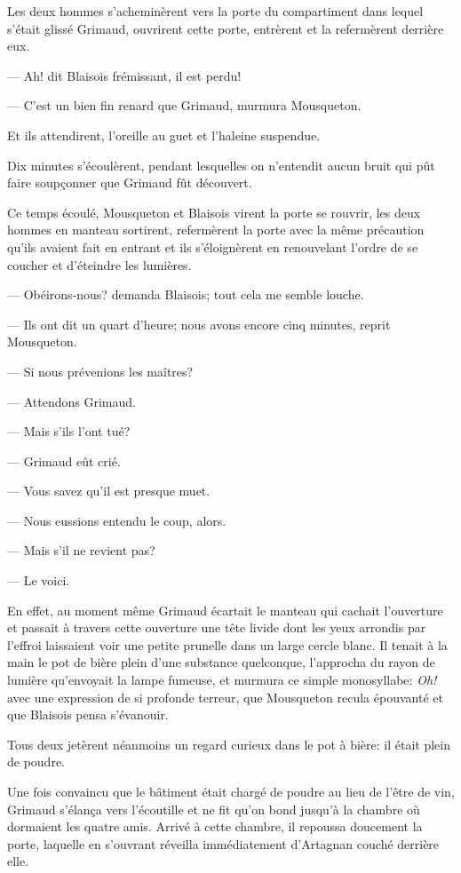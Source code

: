 Les deux hommes s'acheminèrent vers la porte du compartiment dans lequel s'était glissé Grimaud, ouvrirent cette porte, entrèrent et la refermèrent derrière eux.

— Ah! dit Blaisois frémissant, il est perdu!

— C'est un bien fin renard que Grimaud, murmura Mousqueton.

Et ils attendirent, l'oreille au guet et l'haleine suspendue.

Dix minutes s'écoulèrent, pendant lesquelles on n'entendit aucun bruit qui pût faire soupçonner que Grimaud fût découvert.

Ce temps écoulé, Mousqueton et Blaisois virent la porte se rouvrir, les deux hommes en manteau sortirent, refermèrent la porte avec la même précaution qu'ils avaient fait en entrant et ils s'éloignèrent en renouvelant l'ordre de se coucher et d'éteindre les lumières.

— Obéirons-nous? demanda Blaisois; tout cela me semble louche.

— Ils ont dit un quart d'heure; nous avons encore cinq minutes, reprit Mousqueton.

— Si nous prévenions les maîtres?

— Attendons Grimaud.

— Mais s'ils l'ont tué?

— Grimaud eût crié.

— Vous savez qu'il est presque muet.

— Nous eussions entendu le coup, alors.

— Mais s'il ne revient pas?

— Le voici.

En effet, au moment même Grimaud écartait le manteau qui cachait l'ouverture et passait à travers cette ouverture une tête livide dont les yeux arrondis par l'effroi laissaient voir une petite prunelle dans un large cercle blanc. Il tenait à la main le pot de bière plein d'une substance quelconque, l'approcha du rayon de lumière qu'envoyait la lampe fumeuse, et murmura ce simple monosyllabe: \textit{Oh!} avec une expression de si profonde terreur, que Mousqueton recula épouvanté et que Blaisois pensa s'évanouir.

Tous deux jetèrent néanmoins un regard curieux dans le pot à bière: il était plein de poudre.

Une fois convaincu que le bâtiment était chargé de poudre au lieu de l'être de vin, Grimaud s'élança vers l'écoutille et ne fit qu'on bond jusqu'à la chambre où dormaient les quatre amis. Arrivé à cette chambre, il repoussa doucement la porte, laquelle en s'ouvrant réveilla immédiatement d'Artagnan couché derrière elle.

